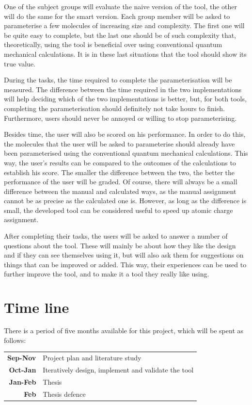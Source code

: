 One of the subject groups will evaluate the naive version of the tool, the other will do the same for the smart version. Each group member will be asked to parameterise a few molecules of increasing size and complexity. The first one will be quite easy to complete, but the last one should be of such complexity that, theoretically, using the tool is beneficial over using conventional quantum mechanical calculations. It is in these last situations that the tool should show its true value.

During the tasks, the time required to complete the parameterisation will be measured. The difference between the time required in the two implementations will help deciding which of the two implementations is better, but, for both tools, completing the parameterisation should definitely not take hours to finish. Furthermore, users should never be annoyed or willing to stop parameterising.

Besides time, the user will also be scored on his performance. In order to do this, the molecules that the user will be asked to parameterise should already have been parameterised using the conventional quantum mechanical calculations. This way, the user's results can be compared to the outcomes of the calculations to establish his score. The smaller the difference between the two, the better the performance of the user will be graded. Of course, there will always be a small difference between the manual and calculated ways, as the manual assignment cannot be as precise as the calculated one is. However, as long as the difference is small, the developed tool can be considered useful to speed up atomic charge assignment.

After completing their tasks, the users will be asked to answer a number of questions about the tool. These will mainly be about how they like the design and if they can see themselves using it, but will also ask them for suggestions on things that can be improved or added. This way, their experiences can be used to further improve the tool, and to make it a tool they really like using.


\section{Time line}

There is a period of five months available for this project, which will be spent as follows:

\noindent
\begin{tabular}{r|l}
\textbf{Sep-Nov} & Project plan and literature study\\
\textbf{Oct-Jan} & Iteratively design, implement and validate the tool\\
\textbf{Jan-Feb} & Thesis\\
\textbf{Feb} & Thesis defence
\end{tabular}

